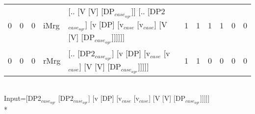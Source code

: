 \begin{tabularx}{\linewidth}{rrrlXrrrrrr}
   0 &       0 &   0 & iMrg & [.. [V [V] [DP$_{case_{agr}}$]] [.. [DP2$_{case_{agr}}$] [v [DP] [v$_{case}$ [v$_{case}$] [V [V] [DP$_{case_{agr}}$]]]]]]                            &             1 &             1 &                  1 &            1 &              0 &             0 \\
   0 &       0 &   0 & rMrg & [.. [DP2$_{case_{agr}}$] [v [DP] [v$_{case}$ [v$_{case}$] [V [V] [DP$_{case_{agr}}$]]]]]                                                       &             1 &             1 &                  0 &            0 &              0 &             0 \\
\hline
\end{tabularx}\endgroup\\
\begingroup\scriptsize Input=[DP2$_{case_{agr}}$ [DP2$_{case_{agr}}$] [v [DP] [v$_{case}$ [v$_{case}$] [V [V] [DP$_{case_{agr}}$]]]]]\\*
